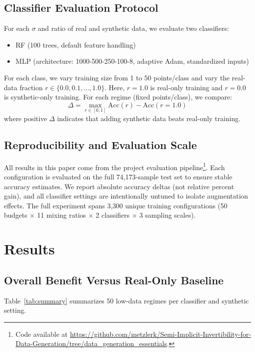 \documentclass[conference]{IEEEtran}
\begin{document}
\subsection{Classifier Evaluation Protocol}
For each $\sigma$ and ratio of real and synthetic data, we evaluate two classifiers:
\begin{itemize}
    \item RF (100 trees, default feature handling)
    \item MLP (architecture: 1000-500-250-100-8, adaptive Adam, standardized inputs)
\end{itemize}

For each class, we vary training size from 1 to 50 points/class and vary the real-data fraction $r \in \{0.0, 0.1, \dots, 1.0\}$. Here, $r=1.0$ is real-only training and $r=0.0$ is synthetic-only training. For each regime (fixed points/class), we compare:
\begin{equation}
\Delta = \max_{r \in [0,1]} \text{Acc}(r) - \text{Acc}(r=1.0)
\end{equation}
where positive $\Delta$ indicates that adding synthetic data beats real-only training.

\subsection{Reproducibility and Evaluation Scale}
All results in this paper come from the project evaluation pipeline\footnote{Code available at \url{https://github.com/metzlerk/Semi-Implicit-Invertibility-for-Data-Generation/tree/data_generation_essentials}.}. Each configuration is evaluated on the full 74,173-sample test set to ensure stable accuracy estimates. We report absolute accuracy deltas (not relative percent gain), and all classifier settings are intentionally untuned to isolate augmentation effects. The full experiment spans 3,300 unique training configurations (50 budgets $\times$ 11 mixing ratios $\times$ 2 classifiers $\times$ 3 sampling scales).

\section{Results}
\subsection{Overall Benefit Versus Real-Only Baseline}
Table~\ref{tab:summary} summarizes 50 low-data regimes per classifier and synthetic setting.
\end{document}
